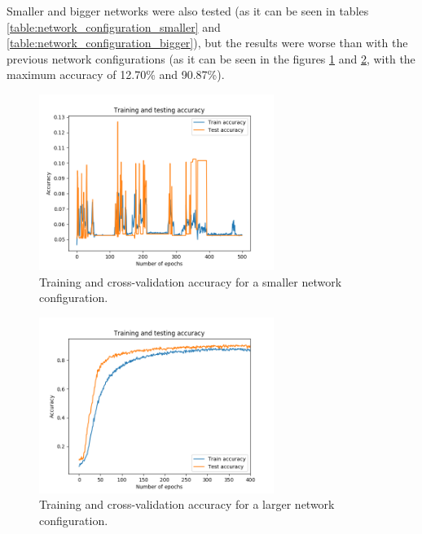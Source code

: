 \documentclass[journal]{IEEEtran}
\begin{document}
Smaller and bigger networks were also tested (as it can be seen in tables \ref{table:network_configuration_smaller} and \ref{table:network_configuration_bigger}), but the results were worse than with the previous network configurations (as it can be seen in the figures \ref{results_5} and \ref{results_6}, with the maximum accuracy of 12.70\% and 90.87\%).

\begin{figure}[!t]
\centering
\includegraphics[width=3in]{images/test_5}
\caption{Training and cross-validation accuracy for a smaller network configuration.}
\label{results_5}
\end{figure}

\begin{figure}[!t]
\centering
\includegraphics[width=3in]{images/test_6}
\caption{Training and cross-validation accuracy for a larger network configuration.}
\label{results_6}
\end{figure}
\end{document}
